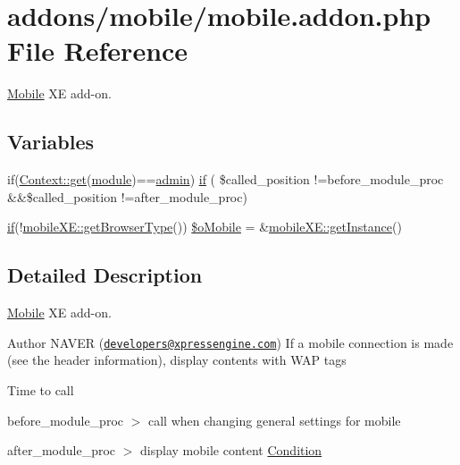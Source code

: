 \hypertarget{mobile_8addon_8php}{}\section{addons/mobile/mobile.addon.\+php File Reference}
\label{mobile_8addon_8php}


\hyperlink{classMobile}{Mobile} XE add-\/on.  


\subsection*{Variables}
\begin{DoxyCompactItemize}
\item 
if(\hyperlink{classContext_a90ce25d65fe6c9778421cbb36ab3def5}{Context\+::get}(\textquotesingle{}\hyperlink{classmodule}{module}\textquotesingle{})==\textquotesingle{}\hyperlink{classadmin}{admin}\textquotesingle{}) \hyperlink{mobile_8addon_8php_a0a3555ef5b81d612224aa52162bb40c6}{if} ( \$called\+\_\+position !=\textquotesingle{}before\+\_\+module\+\_\+proc\textquotesingle{} \&\&\$called\+\_\+position !=\textquotesingle{}after\+\_\+module\+\_\+proc\textquotesingle{})
\item 
\hyperlink{config_8inc_8php_a73b98c0274e28635a594091f9ca43cb4}{if}(!\hyperlink{classmobileXE_a462a4900af63aa2bfbcea2168afbe876}{mobile\+X\+E\+::get\+Browser\+Type}()) \hyperlink{mobile_8addon_8php_a2e1472c6f1bb5b341e95a632164904d0}{\$o\+Mobile} = \&\hyperlink{classmobileXE_a11db662f7f05a929e2559ee6d42fca2c}{mobile\+X\+E\+::get\+Instance}()
\end{DoxyCompactItemize}


\subsection{Detailed Description}
\hyperlink{classMobile}{Mobile} XE add-\/on. 

\begin{DoxyAuthor}{Author}
N\+A\+V\+ER (\href{mailto:developers@xpressengine.com}{\tt developers@xpressengine.\+com}) If a mobile connection is made (see the header information), display contents with W\+AP tags
\end{DoxyAuthor}
Time to call

before\+\_\+module\+\_\+proc $>$ call when changing general settings for mobile

after\+\_\+module\+\_\+proc $>$ display mobile content \hyperlink{classCondition}{Condition} 

